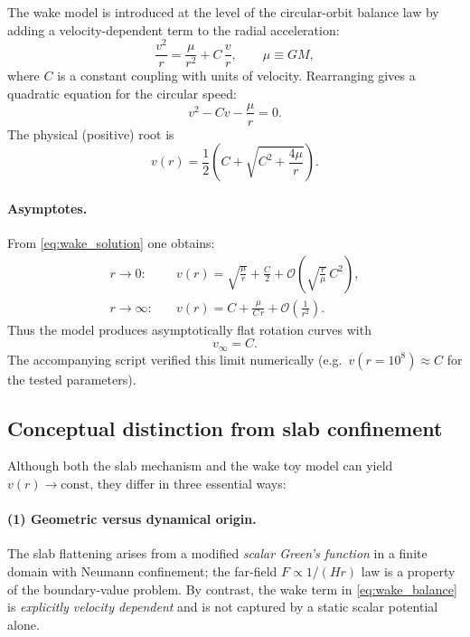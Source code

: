 \documentclass[11pt]{article}
\begin{document}
The wake model is introduced at the level of the circular-orbit balance law by adding a
velocity-dependent term to the radial acceleration:
\begin{equation}
  \frac{v^2}{r}
  =
  \frac{\mu}{r^2}
  + C\,\frac{v}{r},
  \qquad \mu\equiv GM,
  \label{eq:wake_balance}
\end{equation}
where $C$ is a constant coupling with units of velocity.  Rearranging gives a quadratic equation
for the circular speed:
\begin{equation}
  v^2 - C v - \frac{\mu}{r}=0.
  \label{eq:wake_quadratic}
\end{equation}
The physical (positive) root is
\begin{equation}
  v(r)=\frac{1}{2}\left(C+\sqrt{C^2+\frac{4\mu}{r}}\right).
  \label{eq:wake_solution}
\end{equation}

\paragraph{Asymptotes.}
From \eqref{eq:wake_solution} one obtains:
\begin{align}
  r\to 0:\quad
  &v(r)=\sqrt{\frac{\mu}{r}}+\frac{C}{2}+\mathcal{O}\!\left(\sqrt{\frac{r}{\mu}}\,C^2\right),\\[4pt]
  r\to \infty:\quad
  &v(r)=C+\frac{\mu}{C\,r}+\mathcal{O}\!\left(\frac{1}{r^2}\right).
  \label{eq:wake_asymptotes}
\end{align}
Thus the model produces asymptotically flat rotation curves with
\begin{equation}
  v_\infty = C.
\end{equation}
The accompanying script verified this limit numerically (e.g.\ $v(r=10^8)\approx C$ for the tested
parameters).

\subsection{Conceptual distinction from slab confinement}

Although both the slab mechanism and the wake toy model can yield $v(r)\to\text{const}$, they differ
in three essential ways:

\paragraph{(1) Geometric versus dynamical origin.}
The slab flattening arises from a modified \emph{scalar Green's function} in a finite domain with
Neumann confinement; the far-field $F\propto 1/(Hr)$ law is a property of the boundary-value problem.
By contrast, the wake term in \eqref{eq:wake_balance} is \emph{explicitly velocity dependent} and is
not captured by a static scalar potential alone.
\end{document}
